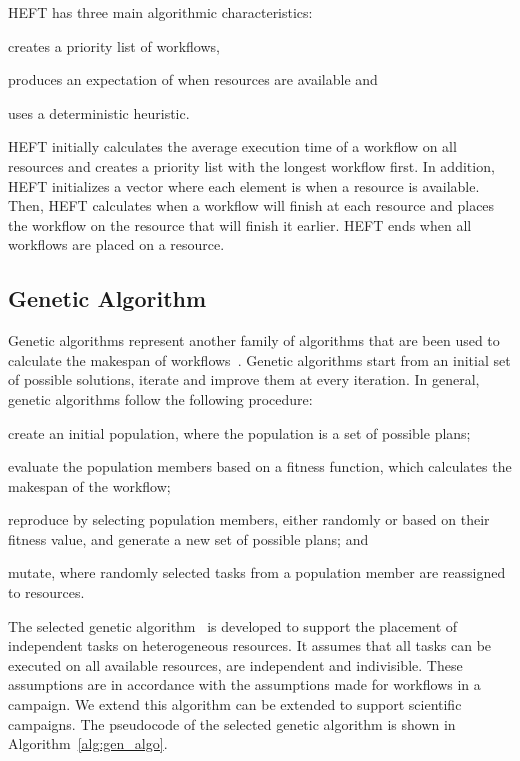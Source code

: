 HEFT has three main algorithmic characteristics:
\begin{inparaenum}[1)]
    \item creates a priority list of workflows,
    \item produces an expectation of when resources are available and
    \item uses a deterministic heuristic.
\end{inparaenum}
HEFT initially calculates the average execution time of a workflow on all resources and creates a priority list with the longest workflow first.
In addition, HEFT initializes a vector where each element is when a resource is available.
Then, HEFT calculates when a workflow will finish at each resource and places the workflow on the resource that will finish it earlier.
HEFT ends when all workflows are placed on a resource.

   
\subsection{Genetic Algorithm}
\label{algo:gen}
Genetic algorithms represent another family of algorithms that are been used to calculate the makespan of workflows~\cite{dong2006scheduling}.
Genetic algorithms start from an initial set of possible solutions, iterate and improve them at every iteration.
In general, genetic algorithms follow the following procedure:
\begin{inparaenum}[(i)]
    \item create an initial population, where the population is a set of possible plans;
    \item evaluate the population members based on a fitness function, which calculates the makespan of the workflow;
    \item reproduce by selecting population members, either randomly or based on their fitness value, and generate a new set of possible plans; and
    \item mutate, where randomly selected tasks from a population member are reassigned to resources.%
\end{inparaenum}

The selected genetic algorithm~\cite{page2005algorithm} is developed to support the placement of independent tasks on heterogeneous resources.
It assumes that all tasks can be executed on all available resources, are independent and indivisible.
These assumptions are in accordance with the assumptions made for workflows in a campaign.
We extend this algorithm can be extended to support scientific campaigns.
The pseudocode of the selected genetic algorithm is shown in Algorithm~\ref{alg:gen_algo}.

